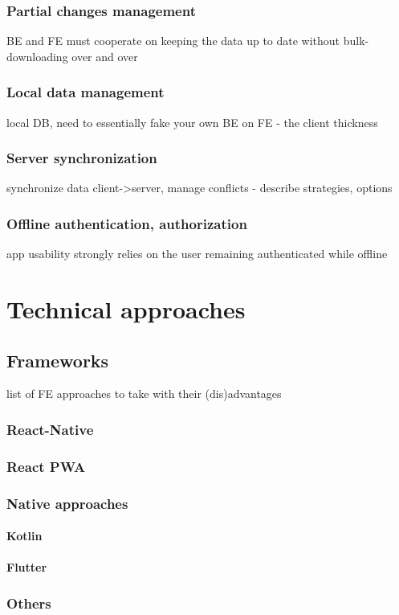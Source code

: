 \documentclass[
  digital,     %
  color,       %
  oneside,     %
  nosansbold,  %
  nocolorbold, %
  lof,         %
  lot,         %
]{fithesis4}
\begin{document}
\subsection{Partial changes management}
BE and FE must cooperate on keeping the data up to date without bulk-downloading over and over
\subsection{Local data management}
local DB, need to essentially fake your own BE on FE - the client thickness
\subsection{Server synchronization}
synchronize data client->server, manage conflicts - describe strategies, options
\subsection{Offline authentication, authorization}
app usability strongly relies on the user remaining authenticated while offline

\chapter{Technical approaches}
\section{Frameworks}
list of FE approaches to take with their (dis)advantages
\subsection{React-Native}
\subsection{React PWA}
\subsection{Native approaches}
\subsubsection{Kotlin}
\subsubsection{Flutter}
\subsection{Others}
\end{document}
